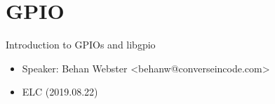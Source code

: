 \section{GPIO}

\begin{frame}
   {Introduction to GPIOs and libgpio}
   \begin{itemize}
      \item Speaker: Behan Webster \textless behanw@converseincode.com\textgreater
      \item ELC (2019.08.22)
   \end{itemize}
\end{frame}

\cprotect\note{

}

